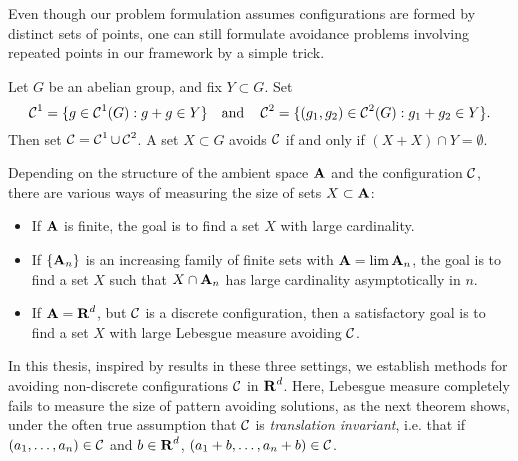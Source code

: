 
Even though our problem formulation assumes configurations are formed by distinct sets of points, one can still formulate avoidance problems involving repeated points in our framework by a simple trick.

\begin{example}
	Let $G$ be an abelian group, and fix $Y \subset G$. Set
	\[ \operatorname{\mathcal{C}}^1 = \{ g \in \operatorname{\mathcal{C}}^1(G): g + g \in Y \} \quad \text{and} \quad \operatorname{\mathcal{C}}^2 = \{ (g_1,g_2) \in \operatorname{\mathcal{C}}^2(G): g_1 + g_2 \in Y \}. \]
	Then set $\operatorname{\mathcal{C}} = \operatorname{\mathcal{C}}^1 \cup \operatorname{\mathcal{C}}^2$. A set $X \subset G$ avoids $\operatorname{\mathcal{C}}$ if and only if $(X + X) \cap Y = \emptyset$.
\end{example}

Depending on the structure of the ambient space $\operatorname{\mathbf{A}}$ and the configuration $\operatorname{\mathcal{C}}$, there are various ways of measuring the size of sets $X \subset \operatorname{\mathbf{A}}$:
%
\begin{itemize}
	\item If $\operatorname{\mathbf{A}}$ is finite, the goal is to find a set $X$ with large cardinality.
	\item If $\{ \operatorname{\mathbf{A}}_n \}$ is an increasing family of finite sets with $\operatorname{\mathbf{A}} = \lim \operatorname{\mathbf{A}}_n$, the goal is to find a set $X$ such that $X \cap \operatorname{\mathbf{A}}_n$ has large cardinality asymptotically in $n$.
	\item If $\operatorname{\mathbf{A}} = \operatorname{\mathbf{R}}^d$, but $\operatorname{\mathcal{C}}$ is a discrete configuration, then a satisfactory goal is to find a set $X$ with large Lebesgue measure avoiding $\operatorname{\mathcal{C}}$.
\end{itemize}
%
In this thesis, inspired by results in these three settings, we establish methods for avoiding non-discrete configurations $\operatorname{\mathcal{C}}$ in $\operatorname{\mathbf{R}}^d$. Here, Lebesgue measure completely fails to measure the size of pattern avoiding solutions, as the next theorem shows, under the often true assumption that $\operatorname{\mathcal{C}}$ is \emph{translation invariant}, i.e. that if $(a_1, \dots, a_n) \in \operatorname{\mathcal{C}}$ and $b \in \operatorname{\mathbf{R}}^d$, $(a_1 + b, \dots, a_n + b) \in \operatorname{\mathcal{C}}$.

